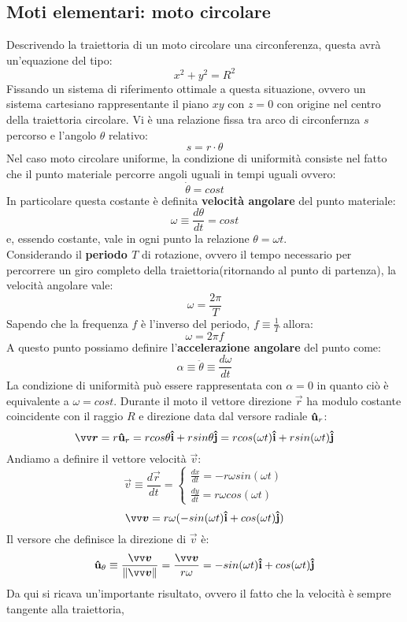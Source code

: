 \subsection*{Moti elementari: moto circolare}
\label{cinem: circ-unif}
Descrivendo la traiettoria di un moto circolare una circonferenza, questa avrà 
un'equazione del tipo:
\[
  x^2 + y^2 = R^2    
\] 
Fissando un sistema di riferimento ottimale a questa situazione, ovvero un sistema
cartesiano rappresentante il piano $xy$ con $z=0$ con origine nel centro della traiettoria
circolare. Vi è una relazione fissa tra arco di circonfernza $s$ percorso e l'angolo $\theta$
relativo:
\[
s = r \cdot \theta     
\]
Nel caso moto circolare uniforme, la condizione di uniformità consiste nel fatto che il punto
materiale percorre angoli uguali in tempi uguali ovvero:
\[
   \dot{\theta} = cost  
\]
In particolare questa costante è definita \textbf{velocità angolare} del punto materiale:
\[
 \omega \equiv \frac{d \theta}{dt} = cost 
\]
e, essendo costante, vale in ogni punto la relazione $\theta = \omega t$.\\
Considerando il \textbf{periodo $T$} di rotazione, ovvero il tempo necessario per percorrere un giro completo
della traiettoria(ritornando al punto di partenza), la velocità angolare vale:
\[
   \omega = \frac{2 \pi}{T}  
\]
Sapendo che la frequenza $f$ è l'inverso del periodo, $f \equiv \frac{1}{T}$ allora:
\[
    \omega = 2 \pi f    
\]
A questo punto possiamo definire l'\textbf{accelerazione angolare} del punto come:
\[
   \alpha \equiv \ddot{\theta} \equiv \frac{d\omega}{dt}     
\]
La condizione di uniformità può essere rappresentata con $\alpha = 0$ in quanto ciò è equivalente a 
$\omega = cost$. 
Durante il moto il vettore direzione $\vec{r}$ ha modulo costante coincidente con il raggio 
$R$ e direzione data dal versore radiale $\mathbf{\hat{u}}_r$:
\[
 \vec{r} = r \v{u}_r = r cos \theta \v{i} + r sin \theta \v{j} = r cos (\omega t) \v{i} +
 r sin (\omega t) \v{j}    
\]
Andiamo a definire il vettore velocità $\vec{v}$:
\[
    \vec{v} \equiv \frac{d \vec{r}}{dt} = 
    \begin{cases}
        \frac{dx}{dt} = -r \omega sin (\omega t) \\
        \frac{dy}{dt} = r \omega cos (\omega t) 
    \end{cases}
\]
\[
 \vec{v} = r \omega(-sin(\omega t)\v{i} +cos (\omega t)\v{j}) 
\]
Il versore che definisce la direzione di $\vec{v}$ è:
\[
   \v{u}_{\theta} \equiv \frac{\vec{v}}{\Norm{v}} = \frac{\vec{v}}{r \omega} =  
   -sin(\omega t)\v{i} +cos (\omega t)\v{j}   
\]
Da qui si ricava un'importante risultato, ovvero il fatto che la velocità è sempre tangente alla traiettoria,
